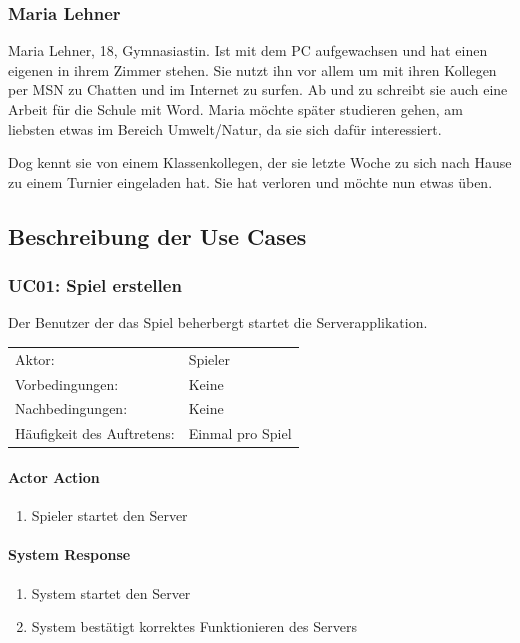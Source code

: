 \documentclass[a4paper,12pt,halfparskip,DIV14]{scrartcl}
\begin{document}
\subsubsection{Maria Lehner}\label{sub:maria_lehner} 

Maria Lehner, 18, Gymnasiastin. Ist mit dem PC aufgewachsen und hat einen eigenen in ihrem Zimmer stehen. Sie nutzt ihn vor allem um mit ihren Kollegen per MSN zu Chatten und im Internet zu surfen. Ab und zu schreibt sie auch eine Arbeit für die Schule mit Word. Maria möchte später studieren gehen, am liebsten etwas im Bereich Umwelt/Natur, da sie sich dafür interessiert. 

Dog kennt sie von einem Klassenkollegen, der sie letzte Woche zu sich nach Hause zu einem Turnier eingeladen hat. Sie hat verloren und möchte nun etwas üben.

\subsection{Beschreibung der Use Cases}\label{sub:use_cases}
\subsubsection{UC01: Spiel erstellen}\label{ssub:uc01_spiel_erstellen}
Der Benutzer der das Spiel beherbergt startet die Serverapplikation.

\begin{tabular}{@{} l l @{}}
	Aktor:       								&	Spieler \\
	Vorbedingungen:							& Keine \\
	Nachbedingungen:						& Keine \\
	Häufigkeit des Auftretens:	& Einmal pro Spiel \\
\end{tabular}
\begin{multicols}{2}
\raggedcolumns
\paragraph{Actor Action}
\begin{enumerate}
	\item[1] Spieler startet den Server
\end{enumerate}
\columnbreak
\paragraph{System Response}
\begin{enumerate}
	\item[2] System startet den Server
	\item[3] System bestätigt korrektes Funktionieren des Servers
\end{enumerate}
\end{multicols}
\end{document}
